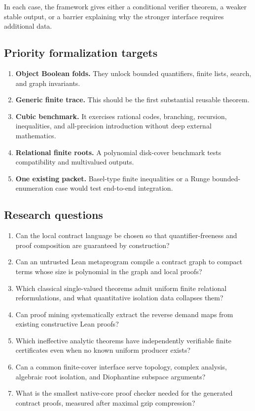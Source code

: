 In each case, the framework gives either a conditional verifier theorem, a
weaker stable output, or a barrier explaining why the stronger interface
requires additional data.

\subsection{Priority formalization targets}

\begin{enumerate}[label=\arabic*.]
\item \textbf{Object Boolean folds.}  They unlock bounded quantifiers,
      finite lists, search, and graph invariants.
\item \textbf{Generic finite trace.}  This should be the first substantial
      reusable  theorem.
\item \textbf{Cubic benchmark.}  It exercises rational codes, branching,
      recursion, inequalities, and all-precision introduction without deep
      external mathematics.
\item \textbf{Relational finite roots.}  A polynomial disk-cover benchmark
      tests compatibility and multivalued outputs.
\item \textbf{One existing packet.}  Basel-type finite inequalities or a
      Runge bounded-enumeration case would test end-to-end integration.
\end{enumerate}

\subsection{Research questions}

\begin{enumerate}[label=\textbf{Q\arabic*.},leftmargin=3em]
\item Can the local contract language be chosen so that quantifier-freeness
      and proof composition are guaranteed by construction?
\item Can an untrusted Lean metaprogram compile a contract graph to compact
       terms whose size is polynomial in the graph and local
      proofs?
\item Which classical single-valued theorems admit uniform finite relational
      reformulations, and what quantitative isolation data collapses them?
\item Can proof mining systematically extract the reverse demand maps from
      existing constructive Lean proofs?
\item Which ineffective analytic theorems have independently verifiable
      finite certificates even when no known uniform producer exists?
\item Can a common finite-cover interface serve topology, complex analysis,
      algebraic root isolation, and Diophantine subspace arguments?
\item What is the smallest native-core proof checker needed for the generated
      contract proofs, measured after maximal gzip compression?
\end{enumerate}

